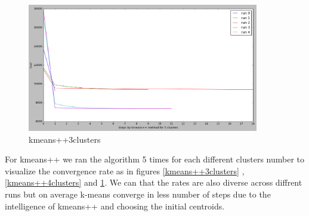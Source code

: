 \begin{figure}[!htb]
\centering
\includegraphics[width=0.9\textwidth]{shots/kmeans++5clusters.png}
\caption{ kmeans++3clusters}
\label{kmeans++5clusters}
\end{figure}
  

For kmeans++ we ran the algorithm 5 times for each different clusters number to visualize the convergence rate as in figures \ref{kmeans++3clusters} , \ref{kmeans++4clusters} and \ref{kmeans++5clusters}. We can that the rates are also diverse across diffrent runs but on average k-means converge in less number of steps due to the intelligence of kmeans++ and choosing the initial centroids. 

